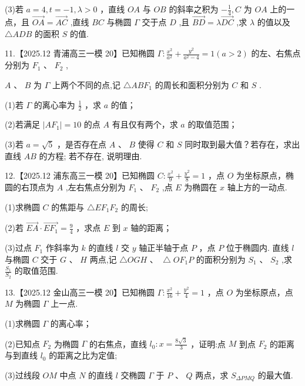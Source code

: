 \documentclass[10pt]{article}
\begin{document}
(3)若 \(a = 4,t =  - 1,\lambda  > 0\) ，直线 \({OA}\) 与 \({OB}\) 的斜率之积为 \(- \frac{1}{4},C\) 为 \({OA}\) 上的一点，且 \(\overrightarrow{OA} = \overrightarrow{AC}\) ,直线 \({BC}\) 与椭圆 \(\Gamma\) 交于点 \(D\) ,且 \(\overrightarrow{BD} = \lambda \overrightarrow{DC}\) ,求 \(\lambda\) 的值以及 \(\bigtriangleup {ADB}\) 的面积 \(S\) 的值.

11.【2025.12 青浦高三一模 20】已知椭圆 \(\Gamma  : \frac{{x}^{2}}{{a}^{2}} + \frac{{y}^{2}}{{a}^{2} - 4} = 1\left( {a > 2}\right)\) 的左、右焦点分别为 \({F}_{1}\text{ 、 }{F}_{2}\) ,

\(A\text{ 、 }B\) 为 \(\Gamma\) 上两个不同的点,记 \(\bigtriangleup {AB}{F}_{1}\) 的周长和面积分别为 \(C\) 和 \(S\) .

(1)若 \(\Gamma\) 的离心率为 \(\frac{1}{2}\) ，求 \(a\) 的值；

(2)若满足 \(\left| {A{F}_{1}}\right|  = {10}\) 的点 \(A\) 有且仅有两个，求 \(a\) 的取值范围；

(3)若 \(a = \sqrt{5}\) ，是否存在点 \(A\) 、 \(B\) 使得 \(C\) 和 \(S\) 同时取到最大值？若存在，求出直线 \({AB}\) 的方程; 若不存在, 说明理由.

12.【2025.12 浦东高三一模 20】已知椭圆 \(C : \frac{{x}^{2}}{9} + \frac{{y}^{2}}{8} = 1\) ，点 \(O\) 为坐标原点，椭圆的右顶点为 \(A\) ,左右焦点分别为 \({F}_{1}\text{ 、 }{F}_{2}\) ,点 \(E\) 为椭圆在 \(x\) 轴上方的一动点.

(1)求椭圆 \(C\) 的焦距与 \(\bigtriangleup E{F}_{1}{F}_{2}\) 的周长;

(2)若 \(\overrightarrow{EA} \cdot  \overrightarrow{E{F}_{1}} = \frac{9}{4}\) ，求点 \(E\) 到 \(x\) 轴的距离；

(3)过点 \({F}_{1}\) 作斜率为 \(k\) 的直线 \(l\) 交 \(y\) 轴正半轴于点 \(P\) ，点 \(P\) 位于椭圆内. 直线 \(l\) 与椭圆 \(C\) 交于 \(G\text{ 、 }H\) 两点,记 \(\bigtriangleup {OGH}\text{ 、 }\bigtriangleup O{F}_{1}P\) 的面积分别为 \({S}_{1}\text{ 、 }{S}_{2}\) ,求 \(\frac{{S}_{1}}{{S}_{2}}\) 的取值范围.

13.【2025.12 金山高三一模 20】已知椭圆 \(\Gamma  : \frac{{x}^{2}}{16} + \frac{{y}^{2}}{4} = 1\) ，点 \(O\) 为坐标原点，点 \(M\) 为椭圆 \(\Gamma\) 上一点.

(1)求椭圆 \(\Gamma\) 的离心率；

(2)已知点 \({F}_{2}\) 为椭圆 \(\Gamma\) 的右焦点，直线 \({l}_{0} : x = \frac{8\sqrt{3}}{3}\) ，证明:点 \(M\) 到点 \({F}_{2}\) 的距离与到直线 \({l}_{0}\) 的距离之比为定值;

(3)过线段 \({OM}\) 中点 \(N\) 的直线 \(l\) 交椭圆 \(\Gamma\) 于 \(P\text{ 、 }Q\) 两点，求 \({S}_{\Delta PMQ}\) 的最大值.
\end{document}
